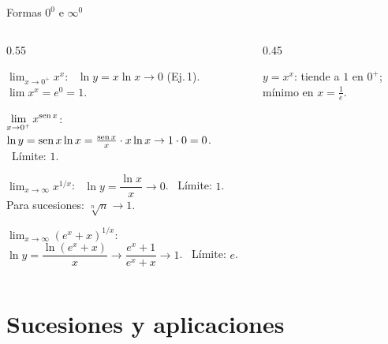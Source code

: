 \documentclass[10pt,aspectratio=169]{beamer}
\begin{document}
\begin{frame}{Formas $0^0$ e $\infty^0$}
  \begin{columns}
    \begin{column}{0.55\textwidth}
      \begin{ejemplo}[13: $0^0$]
        $\displaystyle\lim_{x\to0^+}x^x$: \ $\ln y=x\ln x\to0$ (Ej.\,1). \ $\lim x^x=e^0=1$.
      \end{ejemplo}
      \begin{ejemplo}[14: $0^0$]
        $\displaystyle\lim_{x\to0^+}x^{\operatorname{sen} x}$: \ $\ln y=\operatorname{sen} x\ln x=\frac{\operatorname{sen} x}{x}\cdot x\ln x\to1\cdot0=0$. \ Límite: $1$.
      \end{ejemplo}
      \begin{ejemplo}[15: $\infty^0$]
        $\displaystyle\lim_{x\to\infty}x^{1/x}$: \ $\ln y=\dfrac{\ln x}{x}\to0$. \ Límite: $1$.
        \\ Para sucesiones: $\sqrt[n]n\to1$.
      \end{ejemplo}
      \begin{ejemplo}[16: $\infty^0$]
        $\displaystyle\lim_{x\to\infty}(e^x+x)^{1/x}$: \ $\ln y=\dfrac{\ln(e^x+x)}{x}\to\dfrac{e^x+1}{e^x+x}\to1$. \ Límite: $e$.
      \end{ejemplo}
    \end{column}
    \begin{column}{0.45\textwidth}
      \centering

      \small $y=x^x$: tiende a $1$ en $0^+$; mínimo en $x=\frac1e$.
    \end{column}
  \end{columns}
\end{frame}

\section{Sucesiones y aplicaciones}
\end{document}
